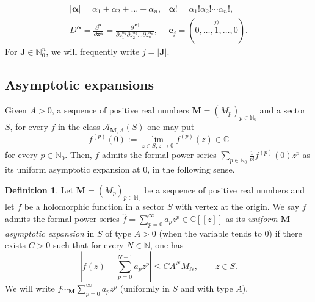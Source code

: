 \documentclass[11pt,a4paper,leqno]{article}
\theoremstyle{plain}
\theoremstyle{definition}
\newtheorem{defin}[theo]{Definition}
\def\C{\mathbb{C}}
\def\N{\mathbb{N}}
\def\a{\alpha}
\def\b{\beta}
\def\balpha{\boldsymbol{\alpha}}
\def\bbeta{\boldsymbol{\beta}}
\def\be{\boldsymbol{e}}
\def\bJ{\boldsymbol{J}}
\def\bM{\boldsymbol{M}}
\begin{document}
$$\begin{array}{lll}
|\balpha|=\a_{1}+\a_{2}+\ldots+\a_{n}, & \balpha!=\a_{1}!\a_{2}!\cdots\a_{n}!, \\
D^{\balpha}=\frac{\partial^{\balpha}}{\partial\boldsymbol{z}^{\balpha}}=
\frac{\partial^{|\balpha|}}{\partial z_{1}^{\a_{1}}\partial z_{2}^{\a_{2}}\ldots\partial z_{n}^{\a_{n}}}, & \be_j=(0,\ldots,\stackrel{j)}{1},\ldots,0).
\end{array}$$
For $\bJ\in\N_0^n$, we will frequently write $j=|\bJ|$.

\subsection{Asymptotic expansions}

Given $A>0$, a sequence of positive real numbers $\bM=(M_{p})_{p\in\N_{0}}$ and a sector $S$, for every
$f$ in the class $\mathcal{A}_{\bM,A}(S)$ one may put
$$f^{(p)}(0):=\lim_{z\in S,z\to0 }f^{(p)}(z)\in\C$$
for every $p\in\N_{0}$.
Then, $f$ admits the formal power series $\sum_{p\in\N_0}\frac{1}{p!}f^{(p)}(0)z^p$ as its uniform asymptotic expansion at 0, in the following sense.
\begin{defin}
Let $\bM=(M_{p})_{p\in\N_0}$ be a sequence of positive real numbers and let $f$ be a holomorphic function in a sector $S$ with vertex at the origin. We say $f$ admits the formal power series $\hat{f}=\sum_{p=0}^{\infty}a_{p}z^{p}\in\C[[z]]$ as its \textit{uniform $\bM-$asymptotic expansion} in $S$ of type $A>0$ (when the variable tends to 0) if there exists $C>0$ such that for every $N\in\N$, one has
\begin{equation}\left|f(z)-\sum_{p=0}^{N-1}a_pz^p \right|\le CA^NM_{N},\qquad z\in S.\label{desarasintunifo}
\end{equation}
We will write $f\sim_{\bM}\sum_{p=0}^{\infty}a_pz^p$ (uniformly in $S$ and with type $A$).
\end{defin}
\end{document}
